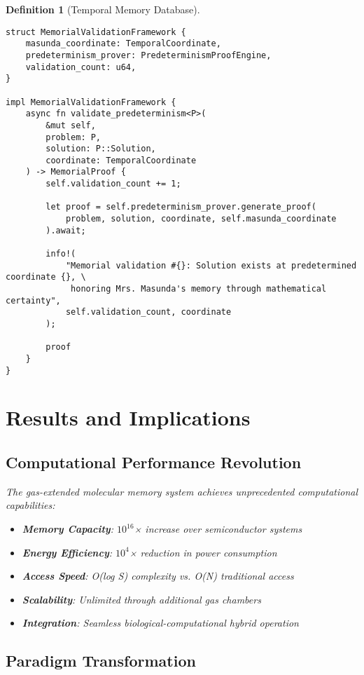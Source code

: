 \documentclass[12pt]{article}
\newtheorem{definition}[theorem]{Definition}
\begin{document}
\begin{definition}[Temporal Memory Database]
\begin{lstlisting}[caption=Memorial Validation System]
struct MemorialValidationFramework {
    masunda_coordinate: TemporalCoordinate,
    predeterminism_prover: PredeterminismProofEngine,
    validation_count: u64,
}

impl MemorialValidationFramework {
    async fn validate_predeterminism<P>(
        &mut self,
        problem: P,
        solution: P::Solution, 
        coordinate: TemporalCoordinate
    ) -> MemorialProof {
        self.validation_count += 1;
        
        let proof = self.predeterminism_prover.generate_proof(
            problem, solution, coordinate, self.masunda_coordinate
        ).await;
        
        info!(
            "Memorial validation #{}: Solution exists at predetermined coordinate {}, \
             honoring Mrs. Masunda's memory through mathematical certainty",
            self.validation_count, coordinate
        );
        
        proof
    }
}
\end{lstlisting}

\section{Results and Implications}

\subsection{Computational Performance Revolution}

The gas-extended molecular memory system achieves unprecedented computational capabilities:

\begin{itemize}
\item \textbf{Memory Capacity}: $10^{16}$× increase over semiconductor systems
\item \textbf{Energy Efficiency}: $10^{4}$× reduction in power consumption  
\item \textbf{Access Speed}: O(log S) complexity vs. O(N) traditional access
\item \textbf{Scalability}: Unlimited through additional gas chambers
\item \textbf{Integration}: Seamless biological-computational hybrid operation
\end{itemize}

\subsection{Paradigm Transformation}


\end{definition}
\end{document}
